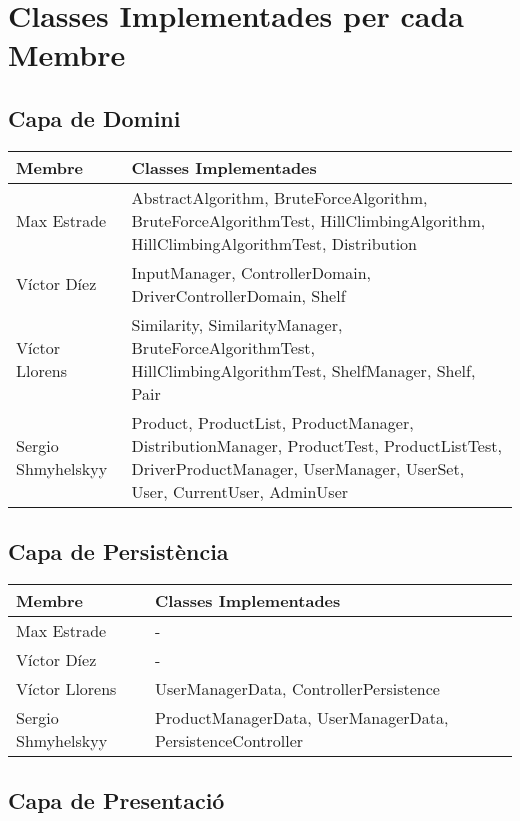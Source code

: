 \documentclass{article}
\begin{document}
\section*{Classes Implementades per cada Membre}

\subsection*{Capa de Domini}

\begin{longtable}{|>{\raggedright\arraybackslash}p{3cm}|>{\raggedright\arraybackslash}p{12cm}|}
\hline
\textbf{Membre} & \textbf{Classes Implementades} \\
\hline
Max Estrade & AbstractAlgorithm, BruteForceAlgorithm, BruteForceAlgorithmTest, HillClimbingAlgorithm, HillClimbingAlgorithmTest, Distribution \\
\hline
Víctor Díez & InputManager, ControllerDomain, DriverControllerDomain, Shelf \\
\hline
Víctor Llorens & Similarity, SimilarityManager, BruteForceAlgorithmTest, HillClimbingAlgorithmTest, ShelfManager, Shelf, Pair \\
\hline
Sergio Shmyhelskyy & Product, ProductList, ProductManager, DistributionManager, ProductTest, ProductListTest, DriverProductManager, UserManager, UserSet, User, CurrentUser, AdminUser \\
\hline
\end{longtable}

\subsection*{Capa de Persistència}

\begin{longtable}{|>{\raggedright\arraybackslash}p{3cm}|>{\raggedright\arraybackslash}p{12cm}|}
\hline
\textbf{Membre} & \textbf{Classes Implementades} \\
\hline
Max Estrade & - \\
\hline
Víctor Díez & - \\
\hline
Víctor Llorens & UserManagerData, ControllerPersistence \\
\hline
Sergio Shmyhelskyy & ProductManagerData, UserManagerData, PersistenceController \\
\hline
\end{longtable}

\subsection*{Capa de Presentació}
\end{document}
